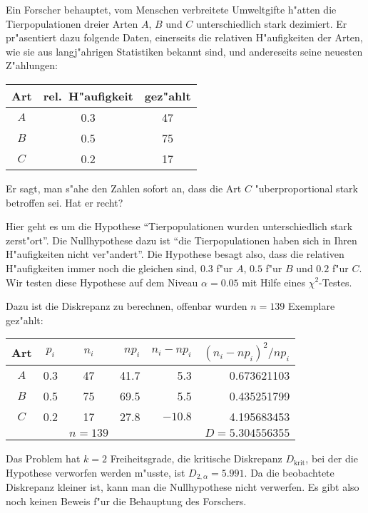 Ein Forscher behauptet, vom Menschen verbreitete Umweltgifte h"atten die
Tierpopulationen dreier Arten $A$, $B$ und $C$ unterschiedlich stark
dezimiert. Er pr"asentiert dazu
folgende Daten, einerseits die relativen H"aufigkeiten der Arten,
wie sie aus langj"ahrigen Statistiken bekannt sind, und
andereseits seine neuesten Z"ahlungen:
\begin{center}
\begin{tabular}{|c|c|c|}
\hline
Art&rel.~H"aufigkeit&gez"ahlt\\
\hline
$A$&0.3&47\\
$B$&0.5&75\\
$C$&0.2&17\\
\hline
\end{tabular}
\end{center}
Er sagt, man s"ahe den Zahlen sofort an, dass die Art $C$ "uberproportional
stark betroffen sei.
Hat er recht?

\begin{loesung}
Hier geht es um die Hypothese ``Tierpopulationen wurden unterschiedlich
stark zerst"ort''. Die Nullhypothese dazu ist ``die Tierpopulationen
haben sich in Ihren H"aufigkeiten nicht ver"andert''. Die Hypothese
besagt also, dass die relativen H"aufigkeiten immer noch die gleichen
sind, $0.3$ f"ur $A$, $0.5$ f"ur $B$ und $0.2$ f"ur $C$.
Wir testen diese Hypothese auf dem Niveau $\alpha=0.05$ mit Hilfe eines
$\chi^2$-Testes.

Dazu ist die Diskrepanz zu berechnen, offenbar wurden $n=139$ Exemplare
gez"ahlt:
\begin{center}
\begin{tabular}{|c|c|c|r|r|r|}
\hline
Art&$p_i$&   $n_i$&$np_i$&$n_i-np_i$&$(n_i-np_i)^2/np_i$\\
\hline
$A$& 0.3 &     47 & 41.7 &    5.3   &   0.673621103     \\
$B$& 0.5 &     75 & 69.5 &    5.5   &   0.435251799     \\
$C$& 0.2 &     17 & 27.8 & $-10.8$  &   4.195683453     \\
\hline
   &     &$n=139$ &      &          &$D=5.304556355$    \\
\hline
\end{tabular}
\end{center}
Das Problem hat $k=2$ Freiheitsgrade, die
kritische Diskrepanz $D_{\text{krit}}$, bei der die Hypothese
verworfen werden m"usste, ist $D_{2,\alpha}=5.991$. Da die
beobachtete Diskrepanz kleiner ist, kann man die Nullhypothese
nicht verwerfen. Es gibt also noch keinen Beweis f"ur die
Behauptung des Forschers.
\end{loesung}
